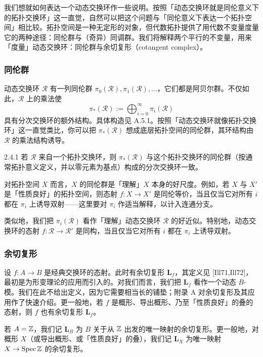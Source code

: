 我们想就如何表达一个动态交换环作一些说明。按照「动态交换环就是同伦意义下的拓扑交换环」这一直觉，自然可以把这个问题与「同伦意义下表达一个拓扑空间」相比较。拓扑空间是一种无定形的对象，但代数拓扑提供了用代数不变量度量它的两种途径：同伦群与（奇异）同调群。我们将解释两个平行的不变量，用来「度量」动态交换环：同伦群与余切复形（cotangent complex）。

\subsubsection{同伦群}

动态交换环 $\mathcal R$ 有一列同伦群 $\pi_0(\mathcal R),\pi_1(\mathcal R),\dots$，它们都是阿贝尔群。不仅如此，$\mathcal R$ 上的乘法使
\[
\pi_*(\mathcal R):=\bigoplus_{i=0}^{\infty}\pi_i(\mathcal R)
\]
具有分次交换环的额外结构。具体构造见 A.5.1。按照「动态交换环就像拓扑交换环」这一直觉类比，你可以把 $\pi_*(\mathcal R)$ 想成底层拓扑空间的同伦群，其环结构由 $\mathcal R$ 的乘法结构诱导。

\begin{exam}{2.4.1}\label{exam:a6-01-2}
若 $\mathcal R$ 来自一个拓扑交换环，则 $\pi_*(\mathcal R)$ 与这个拓扑交换环的同伦群（按通常拓扑意义定义，并以零元素为基点）构成的分次交换环一致。
\end{exam}

对拓扑空间 $X$ 而言，$X$ 的同伦群是「理解」$X$ 本身的好尺度。例如，若 $X$ 与 $X'$ 是「性质良好」的拓扑空间，则态射 $f:X\to X'$ 是同伦等价，当且仅当它对所有 $i$ 都在 $\pi_i$ 上诱导双射——这里要对 $\pi_i$ 作适当解释，以计入连通分支。

类似地，我们把 $\pi_i(\mathcal R)$ 看作「理解」动态交换环 $\mathcal R$ 的好近似。特别地，动态交换环的态射 $f:\mathcal R\to\mathcal R'$ 是同构，当且仅当它对所有 $i$ 都在 $\pi_i$ 上诱导双射。

\subsubsection{余切复形}

设 $f:A\to B$ 是经典交换环的态射。此时有余切复形 $\mathbf L_f$，其定义见 [Ill71,Ill72]，最初是为形变理论的应用而引入的。对我们而言，我们把 $\mathbf L_f$ 看作一个动态 $B$-模。我们在此不给出定义，因为它需要相当长的铺垫；附录 A 对余切复形及其应用作了快速介绍。更一般地，若 $f$ 是概形、导出概形、乃至「性质良好」的叠的态射，则 $f$ 也有余切复形 $\mathbf L_f$。

若 $A=\mathbb{Z}$，我们记 $\mathbf L_B$ 为 $B$ 关于从 $\mathbb{Z}$ 出发的唯一映射的余切复形。更一般地，对概形 $X$（或导出概形、或「性质良好」的叠），我们记 $\mathbf L_X$ 为唯一映射 $X\to\operatorname{Spec}\mathbb{Z}$ 的余切复形。

